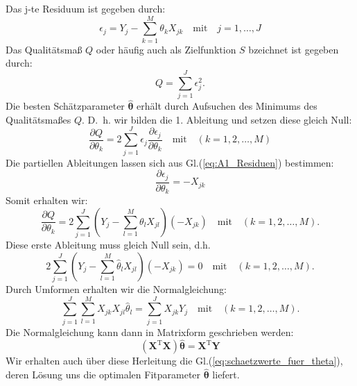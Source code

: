 Das j-te Residuum ist gegeben durch: 
\begin{equation}
\epsilon_j= Y_j - \sum_{k=1}^{M}\theta_k X_{jk} \quad \mathrm{mit} 
\quad j=1,\ldots,J 
\label{eq:A1_Residuen}
\end{equation}
Das Qualitätsmaß $Q$ oder häufig auch als Zielfunktion $S$ bzeichnet 
ist gegeben durch: 
\begin{equation} 
Q = \sum_{j=1}^J \epsilon_j^2. 
\end{equation}
Die besten Schätzparameter $\hat{\boldsymbol{\theta}}$ 
erhält durch Aufsuchen des Minimums des Qualitätsmaßes $Q$.
D.~h. wir bilden die 1. Ableitung und setzen diese gleich Null: 
\begin{equation}
\frac{\partial Q}{\partial \theta_k} =2\sum_{j = 1}^J \epsilon_j\frac{\partial \epsilon_j}{\partial \theta_k} \quad \mathrm{mit} \quad (k=1,2,\ldots, M)
\end{equation}
Die partiellen Ableitungen lassen sich aus Gl.(\ref{eq:A1_Residuen}) bestimmen: 
\begin{equation}
\frac{\partial \epsilon_j}{\partial \theta_k}=-X_{jk}
\end{equation}
Somit erhalten wir:
\begin{equation}
\frac{\partial Q}{\partial \theta_k} = 2\sum_{j=1}^{J} \left( Y_j-\sum_{l=1}^{M} \theta_l X_{jl} \right) (-X_{jk}) 
\quad \mathrm{mit} \quad (k=1,2,\dots, M).
\end{equation}
Diese erste Ableitung muss gleich Null sein, d.h.
\begin{equation}
2\sum_{j=1}^{J} \left( Y_j-\sum_{l=1}^{M} \hat\theta_l X_{jl} \right) (-X_{jk}) 
= 0 \quad \mathrm{mit} \quad (k=1,2,\dots, M).
\end{equation}
Durch Umformen erhalten wir die \glqq Normalgleichung\grqq:
\begin{equation}
\sum_{j=1}^{J} \sum_{l=1}^{M} X_{jk} X_{jl} \hat\theta_l 
= \sum_{j=1}^{J} X_{jk} Y_j \quad \mathrm{mit} \quad (k=1,2,\dots, M).
\end{equation}
Die Normalgleichung kann dann in Matrixform geschrieben werden: 
\begin{equation}
(\mathbf X^\mathrm{T} \mathbf X) \hat{\boldsymbol{\theta}} = \mathbf X^\mathrm{T} \mathbf Y
\end{equation}
Wir erhalten auch über diese Herleitung die Gl.(\ref{eq:schaetzwerte_fuer_theta}),
deren Lösung uns die optimalen Fitparameter $\hat{\boldsymbol{\theta}}$ liefert.

